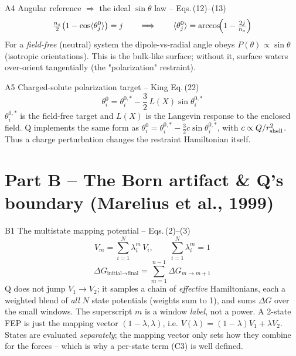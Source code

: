\documentclass[11pt]{article}
\newcommand{\gap}{\vspace{10pt}}
\newcommand{\eq}[1]{{\large\[#1\]}}
\begin{document}
\begin{scaas}{A4 \;\textbullet\; Angular reference $\Rightarrow$ the ideal $\sin\theta$ law \;--\; Eqs.\,(12)--(13)}
\eq{\tfrac{n_s}{2}\bigl(1-\cos\langle\theta_j^0\rangle\bigr)=j
   \qquad\Longrightarrow\qquad
   \langle\theta_j^0\rangle=\arccos\!\Bigl(1-\tfrac{2j}{n_s}\Bigr)}
\small For a \emph{field-free} (neutral) system the dipole-vs-radial angle obeys
$P(\theta)\propto\sin\theta$ (isotropic orientations). This is the bulk-like surface; without it,
surface waters over-orient tangentially (the "polarization" restraint).
\end{scaas}
\gap

\begin{scaas}{A5 \;\textbullet\; Charged-solute polarization target \;--\; King Eq.\,(22)}
\eq{\theta_i^0=\theta_i^{0,*}-\frac{3}{2}\,L(X)\sin\theta_i^{0,*}}
\small $\theta_i^{0,*}$ is the field-free target and $L(X)$ is the Langevin response to the
enclosed field. Q implements the same form as
$\theta_i^0=\theta_i^{0,*}-\tfrac32 c\sin\theta_i^{0,*}$, with
$c\propto Q/r_{\rm shell}^2$. Thus a charge perturbation changes the restraint Hamiltonian itself.
\end{scaas}

\clearpage
\section*{Part B \;--\; The Born artifact \& Q's boundary \textnormal{(Marelius et al., 1999)}}

\begin{born}{B1 \;\textbullet\; The multistate mapping potential \;--\; Eqs.\,(2)--(3)}
\eq{V_m=\sum_{i=1}^{N}\lambda_i^{m}\,V_i,\qquad \sum_{i=1}^{N}\lambda_i^{m}=1}
\eq{\Delta G_{\text{initial}\to\text{final}}=\sum_{m=1}^{n-1}\Delta G_{m\to m+1}}
\small Q does not jump $V_1\!\to\!V_2$; it samples a chain of \emph{effective} Hamiltonians, each a
weighted blend of \emph{all} $N$ state potentials (weights sum to 1), and sums $\Delta G$ over the
small windows. The superscript $m$ is a window \emph{label}, not a power. A 2-state FEP is just the
mapping vector $(1-\lambda,\lambda)$, i.e. $V(\lambda)=(1-\lambda)V_1+\lambda V_2$. States are
evaluated \emph{separately}; the mapping vector only sets how they combine for the forces -- which is
why a per-state term (C3) is well defined.
\end{born}
\gap
\end{document}
